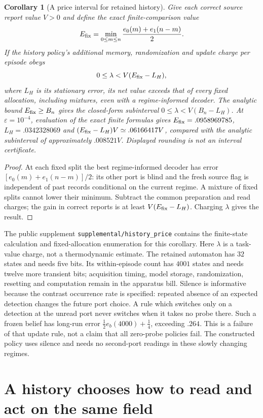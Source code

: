 \documentclass[12pt,a4paper]{article}
\newtheorem{corollary}[theorem]{Corollary}
\begin{document}
\begin{corollary}[A price interval for retained history]
\label{cor:history-price}
Give each correct source report value $V>0$ and define the exact
finite-comparison value
\[
 E_{\rm fix}=\min_{0\le m\le n}
               \frac{e_0(m)+e_1(n-m)}2.
\]
If the history policy's additional memory, randomization and update
charge per episode obeys
\[
 0\le\lambda<V(E_{\rm fix}-L_H),
\]
where $L_H$ is its stationary error, its net value exceeds that of
every fixed allocation, including mixtures, even with a regime-informed
decoder. The analytic bound $E_{\rm fix}\ge B_n$ gives the closed-form
subinterval $0\le\lambda<V(B_n-L_H)$.
At $\varepsilon=10^{-4}$, evaluation of the exact finite formulas gives
$E_{\rm fix}=.0958969785$, $L_H=.0342328069$ and
$(E_{\rm fix}-L_H)V\simeq.06166417V$, compared with the analytic
subinterval of approximately $.008521V$. Displayed rounding is not
an interval certificate.
\end{corollary}
\begin{proof}
At each fixed split the best regime-informed decoder has error
$[e_0(m)+e_1(n-m)]/2$: its other port is blind and the fresh source
flag is independent of past records conditional on the current regime.
A mixture of fixed splits cannot lower their minimum. Subtract the
common preparation and read charges; the gain in correct reports is
at least $V(E_{\rm fix}-L_H)$. Charging $\lambda$ gives the result.
\end{proof}

The public supplement \texttt{supplemental/history\_price} contains the
finite-state calculation and fixed-allocation enumeration for this corollary.
Here $\lambda$ is a task-value charge, not a thermodynamic estimate.
The retained automaton has $32$ states and needs five bits. Its
within-episode count has $4001$ states and needs twelve more transient
bits; acquisition timing, model storage, randomization, resetting and
computation remain in the apparatus bill. Silence is informative
because the contrast occurrence rate is specified: repeated absence
of an expected detection changes the future port choice. A rule
which switches only on a detection at the unread port never switches
when it takes no probe there. Such a frozen belief has long-run error
$\frac12 e_b(4000)+\frac14$, exceeding $.264$.
This is a failure of that update rule, not a claim that all
zero-probe policies fail. The constructed policy uses silence and
needs no second-port readings in these slowly changing regimes.

\section{A history chooses how to read and act on the same field}
\label{sec:field-control}
\end{document}
